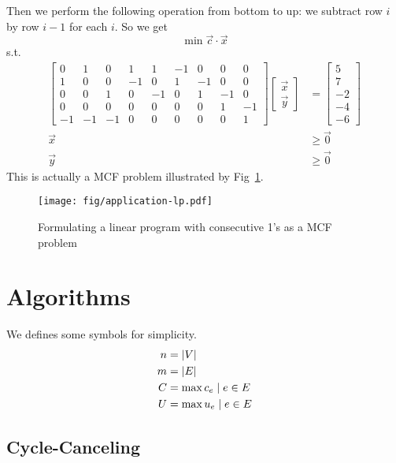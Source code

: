 \documentclass[UTF8,a4paper]{ctexart}
\begin{document}
Then we perform the following operation from bottom to up:
we subtract row $i$ by row $i-1$ for each $i$.
So we get
\[
    \min \vec{c}\cdot\vec{x}
\]
s.t.
\begin{align*}
    \begin{bmatrix}
        0&1&0&1&1& -1&0&0&0\\
        1&0&0&-1&0& 1&-1&0&0\\
        0&0&1&0&-1& 0&1&-1&0\\
        0&0&0&0&0& 0&0&1&-1\\
        -1&-1&-1&0&0& 0&0&0&1
    \end{bmatrix}
    \begin{bmatrix}
        \vec{x}\\
        \vec{y}
    \end{bmatrix}
    &=\begin{bmatrix}
        5\\
        7\\
        -2\\
        -4\\
        -6
    \end{bmatrix}
    \\ \vec{x}&\geq \vec{0}
    \\ \vec{y}&\geq \vec{0}
\end{align*}
This is actually a MCF problem illustrated by Fig~\ref{fig:app:lp}.

\begin{figure}
    \begin{center}
        \texttt{[image: fig/application-lp.pdf]}
    \end{center}
    \caption{Formulating a linear program with consecutive 1's as a MCF problem}
    \label{fig:app:lp}
\end{figure}

\section{Algorithms}

We defines some symbols for simplicity.
\begin{align}
    n&=\left| V \right|\\
    m&=\left| E \right|\\
    C&=\max{c_e \mid e\in E}\\
    U&=\max{u_e \mid e\in E}
\end{align}

\subsection{Cycle-Canceling}
\end{document}
